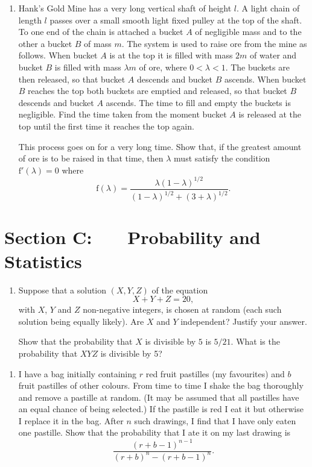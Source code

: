 \documentclass[a4, 11pt]{report}
\newlength{\qspace}
\newcounter{qnumber}
\newenvironment{question}%
 {\vspace{\qspace}
  \begin{enumerate}[\bfseries 1\quad][10]%
    \setcounter{enumi}{\value{qnumber}}%
    \item%
 }
{
  \end{enumerate}
  \filbreak
  \stepcounter{qnumber}
 }
\begin{document}

\begin{question}
Hank's Gold Mine has a very long vertical shaft
of height $l$.
A light chain of length $l$
passes over a 
small smooth
light fixed pulley at the top of the shaft.
To one end of the chain is attached a bucket $A$ of
negligible mass and to the other a bucket $B$ of mass
$m$. The system is used to raise ore from the mine as follows.
When bucket $A$ is at the top it is filled with mass $2m$
of water and bucket $B$ is filled with mass $\lambda m$
of ore, where $0<\lambda<1$. The buckets are then released,
so that bucket $A$ descends and bucket $B$ ascends. 
When bucket $B$
reaches the top both buckets are emptied and released,
so that bucket $B$ descends and bucket $A$ ascends. The time to
fill and empty the buckets is negligible. Find the
time taken from the moment bucket $A$ is released at the top
until the first time it reaches the top again.

This process
goes on for a very long time. Show that, if the greatest
amount of ore is to be raised in that time, then
$\lambda$ must satisfy the condition $\mathrm{f}'(\lambda)=0$
where
\[\mathrm{f}(\lambda)=\frac{\lambda(1-\lambda)^{1/2}}
{(1-\lambda)^{1/2}+(3+\lambda)^{1/2}}.\]

\end{question}
	

	
	\newpage
\section*{Section C: \ \ \ Probability and Statistics}


\begin{question}
Suppose that a solution $(X,Y,Z)$ of the equation
\[X+Y+Z=20,\]
with $X$, $Y$ and $Z$ non-negative
integers, is chosen at
random (each such solution being equally likely).
Are $X$ and $Y$ independent? Justify your answer.

Show that the probability that $X$ is divisible by $5$
is $5/21$.
What is the probability that $XYZ$ is divisible by 5?


\end{question}

\begin{question}
I have a bag initially containing $r$ red fruit pastilles
(my favourites)
and $b$ fruit pastilles of other colours. From time to time
I shake the bag thoroughly and remove a pastille at random.
(It may be assumed that all pastilles have an equal chance
of being selected.) If the pastille is red I eat it
but otherwise I replace it in the bag. After $n$ such
drawings, I find that I have only eaten one pastille.
Show that the probability that I ate it on my last drawing
is
\[\frac{(r+b-1)^{n-1}}{(r+b)^{n}-(r+b-1)^{n}}.\]

\end{question}
\end{document}
